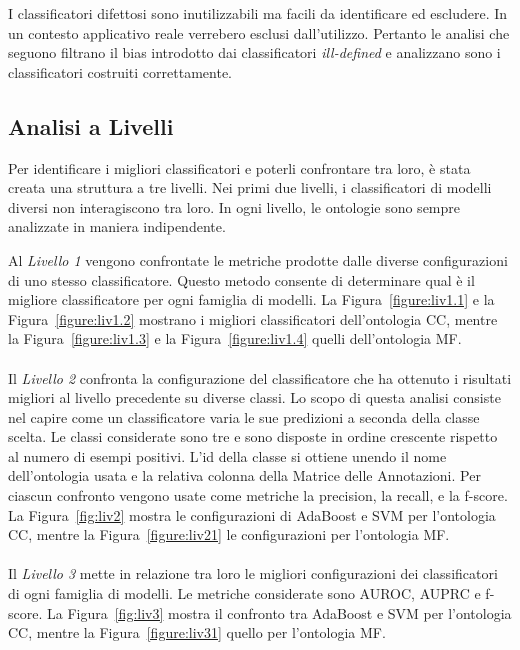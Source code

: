 \documentclass[12pt,a4paper,oneside,hidelinks]{report}
\begin{document}
I classificatori difettosi sono inutilizzabili ma facili da identificare ed escludere. In un contesto applicativo reale verrebero esclusi dall'utilizzo. Pertanto le analisi che seguono filtrano il bias introdotto dai classificatori \emph{ill-defined} e analizzano sono i classificatori costruiti correttamente.

\subsection{Analisi a Livelli}
Per identificare i migliori classificatori e poterli confrontare tra loro, è stata creata una struttura a tre livelli. Nei primi due livelli, i classificatori di modelli diversi non interagiscono tra loro. In ogni livello, le ontologie sono sempre analizzate in maniera indipendente. 

Al \textit{Livello 1} vengono confrontate le metriche prodotte dalle diverse configurazioni di uno stesso classificatore. Questo metodo consente di determinare qual è il migliore classificatore per ogni famiglia di modelli. La Figura~\ref{figure:liv1.1} e la Figura~\ref{figure:liv1.2} mostrano i migliori classificatori dell'ontologia CC, mentre la Figura~\ref{figure:liv1.3} e la Figura~\ref{figure:liv1.4} quelli dell'ontologia MF.

\paragraph*{}
Il \textit{Livello 2} confronta la configurazione del classificatore che ha ottenuto i risultati migliori al livello precedente su diverse classi. Lo scopo di questa analisi consiste nel capire come un classificatore varia le sue predizioni a seconda della classe scelta. Le classi considerate sono tre e sono disposte in ordine crescente rispetto al numero di esempi positivi. L'id della classe si ottiene unendo il nome dell'ontologia usata e la relativa colonna della Matrice delle Annotazioni.
Per ciascun confronto vengono usate come metriche la precision, la recall, e la f-score.
La Figura~\ref{fig:liv2} mostra le configurazioni di AdaBoost e SVM per l'ontologia CC, mentre la Figura~\ref{figure:liv21} le configurazioni per l'ontologia MF.

\paragraph*{}
Il \textit{Livello 3} mette in relazione tra loro le migliori configurazioni dei classificatori di ogni famiglia di modelli. Le metriche considerate sono AUROC, AUPRC e f-score. La Figura~\ref{fig:liv3} mostra il confronto tra AdaBoost e SVM per l'ontologia CC, mentre la Figura~\ref{figure:liv31} quello per l'ontologia MF.
\end{document}
